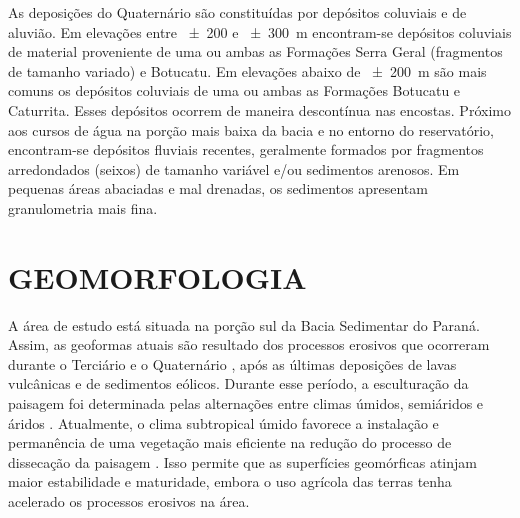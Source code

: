 As deposições do Quaternário são constituídas por depósitos coluviais e de aluvião. Em elevações entre 
\num{\pm200} e \SI{\pm300}{\metre} encontram-se depósitos coluviais de material proveniente de uma ou ambas as 
Formações Serra Geral (fragmentos de tamanho variado) e Botucatu. Em elevações abaixo de \SI{\pm200}{\metre} 
são mais comuns os depósitos coluviais de uma ou ambas as Formações Botucatu e Caturrita. Esses depósitos 
ocorrem de maneira descontínua nas encostas. Próximo aos cursos de água na porção mais baixa da bacia e no 
entorno do reservatório, encontram-se depósitos fluviais recentes, geralmente formados por fragmentos 
arredondados (seixos) de tamanho variável e/ou sedimentos arenosos. Em pequenas áreas abaciadas e mal 
drenadas, 
os sedimentos apresentam granulometria mais fina.

\section{GEOMORFOLOGIA}
\label{sec:chap03-geomorfologia}

A área de estudo está situada na porção sul da Bacia Sedimentar do Paraná. Assim, as geoformas atuais são 
resultado dos processos erosivos que ocorreram durante o Terciário e o Quaternário \cite{Sartori2009}, após as 
últimas deposições de lavas vulcânicas e de sedimentos eólicos. Durante esse período, a esculturação da 
paisagem foi determinada pelas alternações entre climas úmidos, semiáridos e áridos \cite{Sartori2009}. 
Atualmente, o clima subtropical úmido favorece a instalação e permanência de uma vegetação mais eficiente na 
redução do processo de dissecação da paisagem \cite{Sartori2009, NascimentoEtAl2010}. Isso permite que as 
superfícies geomórficas atinjam maior estabilidade e maturidade, embora o uso agrícola das terras tenha 
acelerado os processos erosivos na área.


